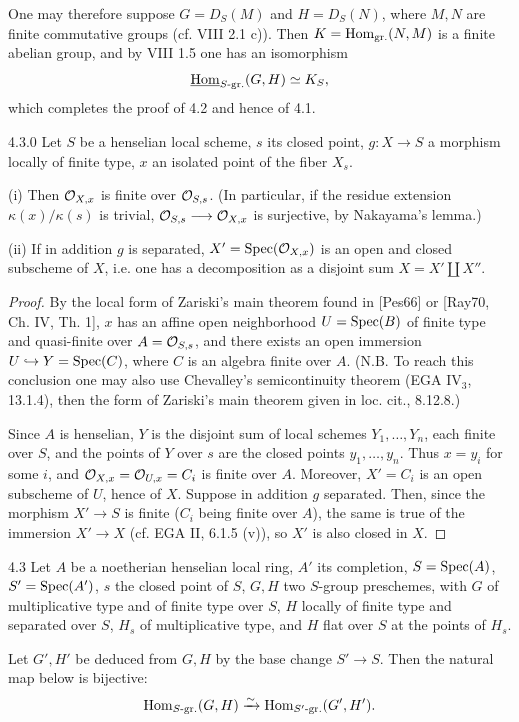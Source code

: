 One may therefore suppose $G=D_S(M)$ and $H=D_S(N)$, where $M,N$ are finite commutative groups (cf. VIII 2.1 c)). Then $K=\operatorname{Hom}_{\mathrm{gr.}}(N,M)$ is a finite abelian group, and by VIII 1.5 one has an isomorphism
\[
\underline{\operatorname{Hom}}_{S\text{-}\mathrm{gr.}}(G,H)\simeq K_S,
\]
which completes the proof of 4.2 and hence of 4.1.
\begin{proposition}{4.3.0}\label{X.4.3.0}
 Let $S$ be a henselian local scheme, $s$ its closed point, $g:X\to S$ a morphism locally of finite type, $x$ an isolated point of the fiber $X_s$.

(i) Then $\mathcal{O}_{X,x}$ is finite over $\mathcal{O}_{S,s}$. (In particular, if the residue extension $\kappa(x)/\kappa(s)$ is trivial, $\mathcal{O}_{S,s}\longrightarrow\mathcal{O}_{X,x}$ is surjective, by Nakayama's lemma.)

(ii) If in addition $g$ is separated, $X'=\operatorname{Spec}(\mathcal{O}_{X,x})$ is an open and closed subscheme of $X$, i.e. one has a decomposition as a disjoint sum $X=X'\coprod X''$.
\end{proposition}
\begin{proof}
By the local form of Zariski's main theorem found in [Pes66] or [Ray70, Ch. IV, Th. 1], $x$ has an affine open neighborhood $U=\operatorname{Spec}(B)$ of finite type and quasi-finite over $A=\mathcal{O}_{S,s}$, and there exists an open immersion $U\hookrightarrow Y=\operatorname{Spec}(C)$, where $C$ is an algebra finite over $A$. (N.B. To reach this conclusion one may also use Chevalley's semicontinuity theorem (EGA IV$_3$, 13.1.4), then the form of Zariski's main theorem given in loc. cit., 8.12.8.)

Since $A$ is henselian, $Y$ is the disjoint sum of local schemes $Y_1,\dots,Y_n$, each finite over $S$, and the points of $Y$ over $s$ are the closed points $y_1,\dots,y_n$. Thus $x=y_i$ for some $i$, and $\mathcal{O}_{X,x}=\mathcal{O}_{U,x}=C_i$ is finite over $A$. Moreover, $X'=C_i$ is an open subscheme of $U$, hence of $X$.
Suppose in addition $g$ separated. Then, since the morphism $X'\to S$ is finite ($C_i$ being finite over $A$), the same is true of the immersion $X'\to X$ (cf. EGA II, 6.1.5 (v)), so $X'$ is also closed in $X$.
\end{proof}
\begin{lemma}{4.3}\label{X.4.3}
Let $A$ be a noetherian henselian local ring, $A'$ its completion, $S=\operatorname{Spec}(A)$, $S'=\operatorname{Spec}(A')$, $s$ the closed point of $S$, $G,H$ two $S$-group preschemes, with $G$ of multiplicative type and of finite type over $S$, $H$ locally of finite type and separated over $S$, $H_s$ of multiplicative type, and $H$ flat over $S$ at the points of $H_s$.

Let $G',H'$ be deduced from $G,H$ by the base change $S'\to S$. Then the natural map below is bijective:
\[
\operatorname{Hom}_{S\text{-}\mathrm{gr.}}(G,H)\xrightarrow{\sim}\operatorname{Hom}_{S'\text{-}\mathrm{gr.}}(G',H').
\]
\end{lemma}
